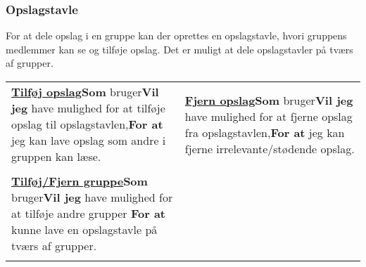 \subsubsection{Opslagstavle}





For at dele opslag i en gruppe kan der oprettes en opslagstavle, hvori gruppens medlemmer kan se og tilføje opslag. Det er muligt at dele opslagstavler på tværs af grupper.\newline

\begin{tabular}{p{2.5in}p{2.5in}}
\textbf{\underline{Tilføj opslag}}\newline \textbf{Som} bruger\newline \textbf{Vil jeg} have mulighed for at tilføje opslag til opslagstavlen,\newline \textbf{For at} jeg kan lave opslag som andre i gruppen kan læse. & 

\textbf{\underline{Fjern opslag}}\newline \textbf{Som} bruger\newline \textbf{Vil jeg}  have mulighed for at fjerne opslag fra opslagstavlen,\newline \textbf{For at} jeg kan fjerne irrelevante/stødende opslag.  \\\\

\textbf{\underline{Tilføj/Fjern gruppe}}\newline \textbf{Som} bruger\newline \textbf{Vil jeg} have mulighed for at tilføje andre grupper
\newline \textbf{For at} kunne lave en opslagstavle på tværs af grupper.  \\\\  
\end{tabular}